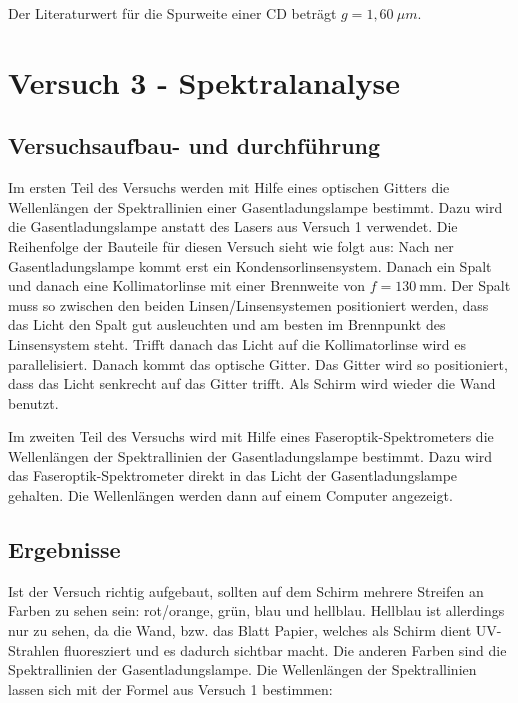        Der Literaturwert für die Spurweite einer CD beträgt $g = 1,60\ \mu m$.

\section{Versuch 3 - Spektralanalyse}
    
    \subsection{Versuchsaufbau- und durchführung}
        
        Im ersten Teil des Versuchs werden mit Hilfe eines optischen Gitters die Wellenlängen der Spektrallinien einer Gasentladungslampe bestimmt. Dazu wird die Gasentladungslampe anstatt des Lasers aus Versuch 1 verwendet. Die Reihenfolge der Bauteile für diesen Versuch sieht wie folgt aus:
        Nach ner Gasentladungslampe kommt erst ein Kondensorlinsensystem. Danach ein Spalt und danach eine Kollimatorlinse mit einer Brennweite von $f = 130\ \mathrm{mm}$. Der Spalt muss so zwischen den beiden Linsen/Linsensystemen positioniert werden, dass das Licht den Spalt gut ausleuchten und am besten im Brennpunkt des Linsensystem steht. Trifft danach das Licht auf die Kollimatorlinse wird es parallelisiert. Danach kommt das optische Gitter. Das Gitter wird so positioniert, dass das Licht senkrecht auf das Gitter trifft. Als Schirm wird wieder die Wand benutzt.

        Im zweiten Teil des Versuchs wird mit Hilfe eines Faseroptik-Spektrometers die Wellenlängen der Spektrallinien der Gasentladungslampe bestimmt. Dazu wird das Faseroptik-Spektrometer direkt in das Licht der Gasentladungslampe gehalten. Die Wellenlängen werden dann auf einem Computer angezeigt.
        
    \subsection{Ergebnisse}

        Ist der Versuch richtig aufgebaut, sollten auf dem Schirm mehrere Streifen an Farben zu sehen sein: rot/orange, grün, blau und \glqq hellblau\grqq. Hellblau ist allerdings nur zu sehen, da die Wand, bzw. das Blatt Papier, welches als Schirm dient UV-Strahlen fluoresziert und es dadurch sichtbar macht. Die anderen Farben sind die Spektrallinien der Gasentladungslampe. Die Wellenlängen der Spektrallinien lassen sich mit der Formel aus Versuch 1 bestimmen:

